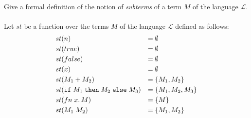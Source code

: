 \subsection{}

Give a formal definition of the notion of \emph{subterms} of a term $M$ of the language $\mathcal{L}$.\\\\
Let $st$ be a function over the terms $M$ of the language $\mathcal{L}$ defined as follows:
\begin{align*}
	 & st(n)                  & =\; & \emptyset           \\
	 & st(true)               & =\; & \emptyset           \\
	 & st(false)              & =\; & \emptyset           \\
	 & st(x)                  & =\; & \emptyset           \\
	 & st(M_1+M_2)     & =\; & \{ M_1, M_2 \}      \\
	 & st(\texttt{if}\;M_1\;\texttt{then}\;M_2\;\texttt{else}\;M_3) & =\; & \{ M_1, M_2, M_3 \} \\
	 & st(fn\;x.\,M)          & =\; & \{ M \}             \\
	 & st(M_1\;M_2)     & =\; & \{ M_1, M_2 \}      \\
\end{align*}
